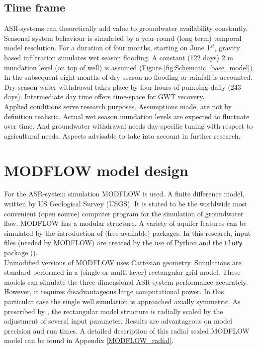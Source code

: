 \subsection{Time frame} 
ASR-systems can theoretically add value to groundwater availability constantly. Seasonal system behaviour is simulated by a year-round (long term) temporal model resolution. For a duration of four months, starting on June 1$^{st}$, gravity based infiltration simulates wet season flooding. A constant (122 days) 2 m inundation level (on top of well) is assumed (Figure \ref{fig:Schematic_base_model}). In the subsequent eight months of dry season no flooding or rainfall is accounted. Dry season water withdrawal takes place by four hours of pumping daily (243 days). Intermediate day time offers time-space for GWT recovery. \\

Applied conditions serve research purposes. Assumptions made, are not by definition realistic. Actual wet season inundation levels are expected to fluctuate over time. And groundwater withdrawal needs day-specific tuning with respect to agricultural needs. Aspects advisable to take into account in further research. 

\section{MODFLOW model design}
\label{section:MODFLOW_const}
For the ASR-system simulation MODFLOW is used. A finite difference model, written by US Geological Survey (USGS). It is stated to be the worldwide most convenient (open source) computer program for the simulation of groundwater flow. MODFLOW has a modular structure. A variety of aquifer features can be simulated by the introduction of (free available) packages. In this research, input files (needed by MODFLOW) are created by the use of Python and the \texttt{FloPy} package (\citep{Niswonger2011,HarbaughArlen2005}). \\

Unmodified versions of MODFLOW uses Cartesian geometry. Simulations are standard performed in a (single or multi layer) rectangular grid model. These models can simulate the three-dimensional ASR-system performance accurately. However, it requires disadvantageous large computational power. In this particular case the single well simulation is approached axially symmetric. As prescribed by \citet{Langevin2008}, the rectangular model structure is radially scaled by the adjustment of several input parameter. Results are advantageous on model precision and run times. A detailed description of this radial scaled MODFLOW model can be found in Appendix \ref{MODFLOW_radial}. \\

